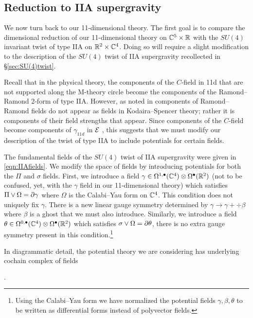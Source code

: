 \subsection{Reduction to IIA supergravity}
\label{s:su4red}

We now turn back to our 11-dimensional theory. 
The first goal is to compare the dimensional reduction of our 11-dimensional theory on $\mathbb C^5 \times \mathbb R$
with the $SU(4)$ invariant twist of type IIA on $\mathbb{R}^{2}\times \mathbb C^4$. 
Doing so will require a slight modification to the description of the $SU(4)$ twist of IIA supergravity recollected in \S \ref{sec:SU(4)twist}. 


Recall that in the physical theory, the components of the $C$-field in 11d that are not supported along the M-theory circle become the components of the Ramond--Ramond 2-form of type IIA. However, as noted in \cite{CLSugra} components of Ramond--Ramond fields do not appear as fields in Kodaira--Spencer theory; rather it is components of their field strengths that appear. Since components of the $C$-field become components of $\gamma_{11d}$ in $\mathcal E$ , this suggests that we must modify our description of the twist of type IIA to include potentials for certain fields.

The fundamental fields of the $SU(4)$ twist of IIA supergravity were given in \eqref{eqn:IIAfields}. 
We modify the space of fields by introducing potentials for both the $\Pi$ and $\sigma$ fields. 
First, we introduce a field $\gamma \in \Omega^{1,\bullet}(\mathbb C^4) \otimes \Omega^\bullet(\mathbb R^2)$ (not to be confused, yet, with the $\gamma$ field in our 11-dimensional theory) which satisfies $\Pi \vee \Omega = \partial \gamma$ where $\Omega$ is the Calabi--Yau form on $\mathbb C^4$. 
This condition does not uniquely fix $\gamma$. 
There is a new linear gauge symmetry determined by $\gamma \to \gamma + \div \beta$ where $\beta$ is a ghost that we must also introduce. 
Similarly, we introduce a field $\theta \in \Omega^{0,\bullet}(\mathbb C^4) \otimes \Omega^\bullet(\mathbb R^2)$ which satisfies $\sigma \vee \Omega = \partial \theta$, there is no extra gauge symmetry present in this condition.\footnote{Using the Calabi--Yau form we have normalized the potential fields $\gamma, \beta,\theta$ to be written as differential forms instead of polyvector fields.}

In diagrammatic detail, the potential theory we are considering has underlying cochain complex of fields
\beqn\label{eqn:IIApot}
\eeqn.

